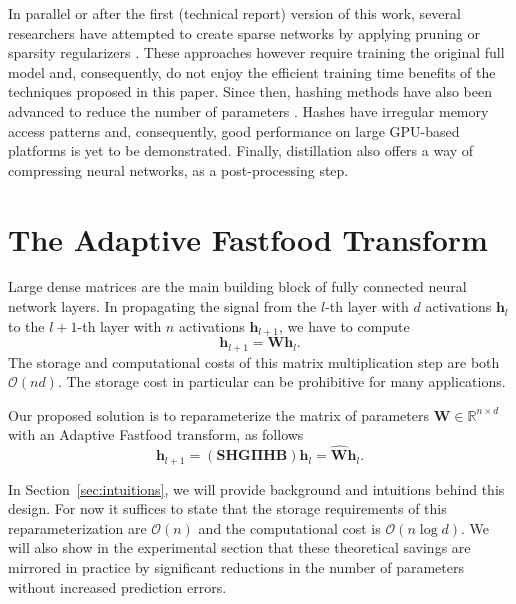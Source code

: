 \documentclass[10pt,twocolumn,letterpaper]{article}
\newcommand{\myvec}[1]{\mathbf{#1}}
\newcommand{\myvecsym}[1]{\boldsymbol{#1}}
\newcommand{\vPi}{\myvecsym{\Pi}}
\newcommand{\vh}{\myvec{h}}
\newcommand{\vB}{\myvec{B}}
\newcommand{\vG}{\myvec{G}}
\newcommand{\vH}{\myvec{H}}
\newcommand{\vS}{\myvec{S}}
\newcommand{\vW}{\myvec{W}}
\newcommand{\be}{\begin{equation}}
\newcommand{\ee}{\end{equation}}
\begin{document}
In parallel or after the first (technical report) version of this work, several researchers have attempted to create sparse networks by applying pruning or sparsity regularizers \cite{Collins2014,blundell-uncertainty-2015,Liu_2015_CVPR,Han2015}. These approaches however require training the original full model and, consequently, do not enjoy the efficient training time benefits of the techniques proposed in this paper. Since then,
hashing methods have also been advanced to reduce the number of parameters \cite{Chen2015,Bakhtiary15}. Hashes have irregular memory access patterns and, consequently, good performance on large GPU-based platforms is yet to be demonstrated.
Finally, distillation \cite{Hinton15,Romero2015} also offers a way of compressing neural networks, as a post-processing step.




\section{The Adaptive Fastfood Transform}
\label{sec:aft}

Large dense matrices are the main building block of fully connected neural network layers.  In propagating the signal from the $l$-th layer with $d$ activations $\vh_{l}$ to the $l+1$-th layer with $n$ activations $\vh_{l+1}$, we have to compute
\be
\vh_{l+1} = \vW \vh_{l}.
\ee
The storage and computational costs of this matrix multiplication step are both $\mathcal{O}(nd)$. The storage cost in particular can be prohibitive for many applications.

Our proposed solution is to reparameterize the matrix of parameters $\vW \in \mathbb{R}^{n \times d}$ with an Adaptive Fastfood transform, as follows
\be
\vh_{l+1} = \left(\vS\vH\vG\vPi \vH\vB\right) \vh_{l} = \widehat{\vW}\vh_{l}.
\ee

In Section~\ref{sec:intuitions}, we will provide background and intuitions behind this design. For now it suffices to state that the storage requirements of this reparameterization are $\mathcal{O}(n)$ and the computational cost is $\mathcal{O}(n \log d)$. We will also show in the experimental section that these theoretical savings are mirrored in practice by significant reductions in the number of parameters without increased prediction errors.
\end{document}
